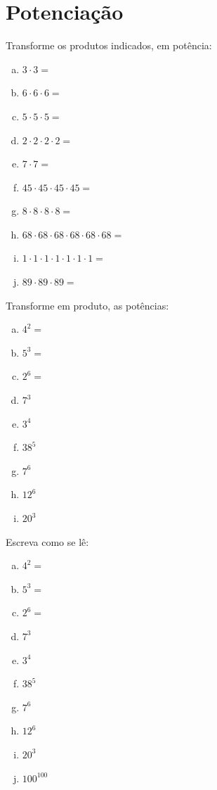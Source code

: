 \section{Potenciação}

\item Transforme os produtos indicados, em potência:
\begin{multicols}{3}
\begin{enumerate}[a)]
	\item $3\cdot 3 =$
	\item $6\cdot  6\cdot  6 =$
	\item $5\cdot  5\cdot  5 =$
	\item $2\cdot  2\cdot  2\cdot  2 =$
	\item $7\cdot  7 =$
	\item $45\cdot  45\cdot  45\cdot  45=$
	\item $8\cdot  8\cdot  8\cdot  8 =$
	\item $ 68\cdot  68\cdot  68\cdot  68\cdot  68\cdot  68=$
	\item $1\cdot  1\cdot  1\cdot  1\cdot  1\cdot  1\cdot  1 =$
	\item $ 89\cdot  89\cdot  89 =$
\end{enumerate}
\end{multicols}

\item Transforme em produto, as potências:
\begin{multicols}{3}
\begin{enumerate}[a)]
	\item $4^2=$
	\item $5^3=$
	\item $2^6=$
	\item $7^3$
	\item $3^4$
	\item $38^5$
	\item $7^6$
	\item $12^6$
	\item $20^3$	
\end{enumerate}
\end{multicols}

\item Escreva como se lê:
\begin{multicols}{5}
\begin{enumerate}[a)]
	\item $4^2=$
	\item $5^3=$
	\item $2^6=$
	\item $7^3$
	\item $3^4$
	\item $38^5$
	\item $7^6$
	\item $12^6$
	\item $20^3$
	\item $100^{100}$
\end{enumerate}
\end{multicols}


